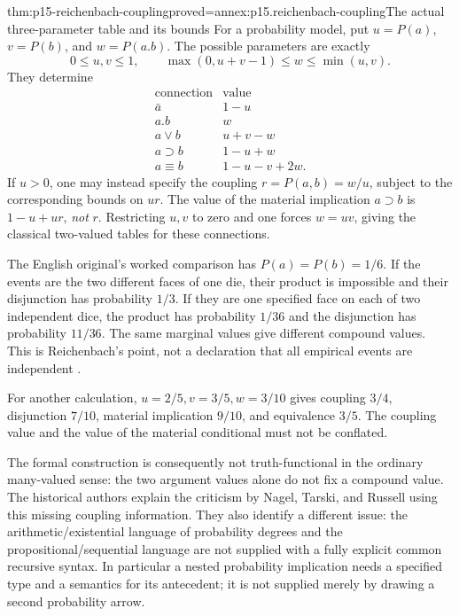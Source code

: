 \begin{hbtheorem}{thm:p15-reichenbach-coupling}{proved=annex:p15.reichenbach-coupling}{The actual three-parameter table and its bounds}
For a probability model, put \(u=P(a)\), \(v=P(b)\), and
\(w=P(a.b)\). The possible parameters are exactly
\[
 0\leq u,v\leq1,\qquad
 \max(0,u+v-1)\leq w\leq\min(u,v).
\]
They determine
\[
\begin{array}{c|c}
 \text{connection}&\text{value}\\\hline
 \bar a&1-u\\
 a.b&w\\
 a\lor b&u+v-w\\
 a\supset b&1-u+w\\
 a\equiv b&1-u-v+2w.
\end{array}
\]
If \(u>0\), one may instead specify the coupling
\(r=P(a,b)=w/u\), subject to the corresponding bounds on
\(ur\). The value of the material implication \(a\supset b\)
is \(1-u+ur\), \emph{not} \(r\). Restricting \(u,v\)
to zero and one forces \(w=uv\), giving the classical two-valued
tables for these connections.
\end{hbtheorem}

The English original's worked comparison has \(P(a)=P(b)=1/6\).
If the events are the two different faces of one die, their product
is impossible and their disjunction has probability \(1/3\).
If they are one specified face on each of two independent dice,
the product has probability \(1/36\) and the disjunction has
probability \(11/36\). The same marginal values give different
compound values. This is Reichenbach's point, not a declaration that
all empirical events are independent
\cite[sec.~35, pp.~320--325]{Reichenbach1938EPChapterReading}.

For another calculation, \(u=2/5,v=3/5,w=3/10\) gives coupling
\(3/4\), disjunction \(7/10\), material implication \(9/10\),
and equivalence \(3/5\). The coupling value and the value of the
material conditional must not be conflated.

The formal construction is consequently not truth-functional in the
ordinary many-valued sense: the two argument values alone do not fix
a compound value. The historical authors explain the criticism by
Nagel, Tarski, and Russell using this missing coupling information.
They also identify a different issue: the arithmetic/existential
language of probability degrees and the propositional/sequential
language are not supplied with a fully explicit common recursive
syntax. In particular a nested probability implication needs a
specified type and a semantics for its antecedent; it is not supplied
merely by drawing a second probability arrow.

